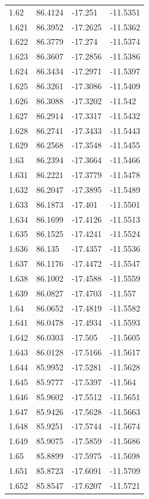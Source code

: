 \begin{tabular}{llll}
1.62 & 86.4124 & -17.251 & -11.5351 \\
1.621 & 86.3952 & -17.2625 & -11.5362 \\
1.622 & 86.3779 & -17.274 & -11.5374 \\
1.623 & 86.3607 & -17.2856 & -11.5386 \\
1.624 & 86.3434 & -17.2971 & -11.5397 \\
1.625 & 86.3261 & -17.3086 & -11.5409 \\
1.626 & 86.3088 & -17.3202 & -11.542 \\
1.627 & 86.2914 & -17.3317 & -11.5432 \\
1.628 & 86.2741 & -17.3433 & -11.5443 \\
1.629 & 86.2568 & -17.3548 & -11.5455 \\
1.63 & 86.2394 & -17.3664 & -11.5466 \\
1.631 & 86.2221 & -17.3779 & -11.5478 \\
1.632 & 86.2047 & -17.3895 & -11.5489 \\
1.633 & 86.1873 & -17.401 & -11.5501 \\
1.634 & 86.1699 & -17.4126 & -11.5513 \\
1.635 & 86.1525 & -17.4241 & -11.5524 \\
1.636 & 86.135 & -17.4357 & -11.5536 \\
1.637 & 86.1176 & -17.4472 & -11.5547 \\
1.638 & 86.1002 & -17.4588 & -11.5559 \\
1.639 & 86.0827 & -17.4703 & -11.557 \\
1.64 & 86.0652 & -17.4819 & -11.5582 \\
1.641 & 86.0478 & -17.4934 & -11.5593 \\
1.642 & 86.0303 & -17.505 & -11.5605 \\
1.643 & 86.0128 & -17.5166 & -11.5617 \\
1.644 & 85.9952 & -17.5281 & -11.5628 \\
1.645 & 85.9777 & -17.5397 & -11.564 \\
1.646 & 85.9602 & -17.5512 & -11.5651 \\
1.647 & 85.9426 & -17.5628 & -11.5663 \\
1.648 & 85.9251 & -17.5744 & -11.5674 \\
1.649 & 85.9075 & -17.5859 & -11.5686 \\
1.65 & 85.8899 & -17.5975 & -11.5698 \\
1.651 & 85.8723 & -17.6091 & -11.5709 \\
1.652 & 85.8547 & -17.6207 & -11.5721 \\

\end{tabular}
